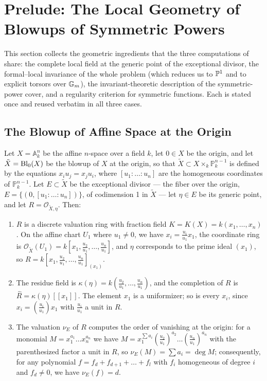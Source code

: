\section{Prelude: The Local Geometry of Blowups of Symmetric Powers}\label{section:blowup_prelude}

This section collects the geometric ingredients that the three computations
of  share: the complete local
field at the generic point of the exceptional divisor, the formal--local
invariance of the whole problem (which reduces us to $\mathbb{P}^1$ and to explicit
torsors over $\mathbb{G}_m$), the invariant-theoretic description of the
symmetric-power cover, and a regularity criterion for symmetric functions.
Each is stated once and reused verbatim in all three cases.

\subsection*{The Blowup of Affine Space at the Origin}

\begin{prop}\label{prop:blowup_local_ring_at_exceptional}
Let $X = \mathbb{A}_k^n$ be the affine $n$-space over a field $k$, let $0 \in X$ be the origin,
and let $\tilde{X} = \operatorname{Bl}_0(X)$ be the blowup of $X$ at the origin, so that
$\tilde{X} \subset X \times_k \mathbb{P}^{n-1}_k$ is defined by the equations $x_i u_j = x_j u_i$, where $[u_1 : \dots : u_n]$ are the homogeneous coordinates of
$\mathbb{P}^{n-1}_k$. Let $E \subset \tilde{X}$ be the exceptional divisor --- the fiber over the origin,
$E = \{ (0, [u_1 : \dots : u_n]) \}$, of codimension 1 in $\tilde{X}$ --- let
$\eta \in E$ be its generic point, and let $R = \mathcal{O}_{\tilde{X}, \eta}$. Then:
\begin{enumerate}
    \item $R$ is a discrete valuation ring with fraction field $K = K(X) = k(x_1, \dots, x_n)$.
    On the affine chart $U_1$ where $u_1 \neq 0$, we have $x_i = \frac{u_i}{u_1} x_1$, the coordinate ring is
    $\mathcal{O}_{\tilde{X}}(U_1) = k\left[x_1, \frac{u_2}{u_1}, \dots, \frac{u_n}{u_1}\right]$,
    and $\eta$ corresponds to the prime ideal $(x_1)$, so
    $R = k[x_1, \frac{u_2}{u_1}, \dots, \frac{u_n}{u_1}]_{(x_1)}$.
    \item The residue field is $\kappa(\eta) = k(\frac{u_2}{u_1}, \dots, \frac{u_n}{u_1})$, and the completion of $R$ is
    $\hat{R} = \kappa(\eta)[[x_1]]$. The element $x_1$ is a uniformizer; so is every $x_i$, since
    $x_i = (\frac{u_i}{u_1}) x_1$ with $\frac{u_i}{u_1}$ a unit in $R$.
    \item The valuation $\nu_E$ of $R$ computes the order of vanishing at the origin:
    for a monomial $M = x_1^{a_1} \dots x_n^{a_n}$ we have
    $M = x_1^{\sum a_i} \left( \frac{u_2}{u_1} \right)^{a_2} \dots \left( \frac{u_n}{u_1} \right)^{a_n}$
    with the parenthesized factor a unit in $R$, so $\nu_E(M) = \sum a_i = \deg M$; consequently, for any polynomial
    $f = f_d + f_{d+1} + \dots + f_l$ with $f_i$ homogeneous of degree $i$ and $f_d \neq 0$, we have $\nu_E(f) = d$.
\end{enumerate}
\end{prop}

